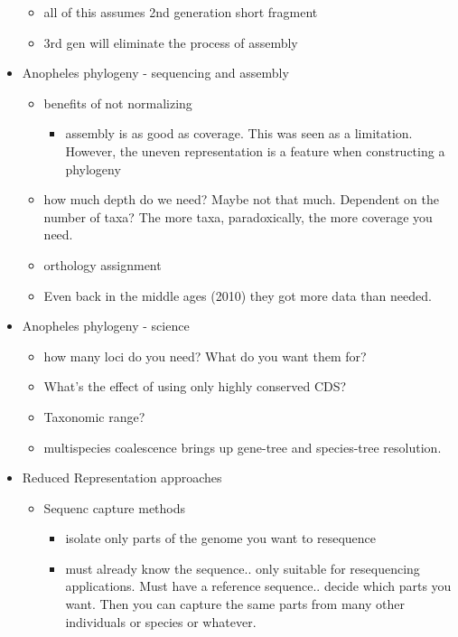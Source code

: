 \documentclass{article}
\begin{document}
\begin{itemize}
\begin{itemize}
            \item all of this assumes 2nd generation short fragment
            \item 3rd gen will eliminate the process of assembly
        \end{itemize}
        \item Anopheles phylogeny - sequencing and assembly
        \begin{itemize}
            \item benefits of not normalizing
            \begin{itemize}
                \item assembly is as good as coverage.  This was seen as a limitation.  However, the uneven representation is a feature when constructing a phylogeny
            \end{itemize}
            \item how much depth do we need?  Maybe not that much.  Dependent on the number of taxa?  The more taxa, paradoxically, the more coverage you need.
            \item orthology assignment
            \item Even back in the middle ages (2010) they got more data than needed.
        \end{itemize}
        \item Anopheles phylogeny - science
        \begin{itemize}
            \item how many loci do you need?  What do you want them for?
            \item What's the effect of using only highly conserved CDS?
            \item Taxonomic range?
            \item multispecies coalescence brings up gene-tree and species-tree resolution.
        \end{itemize}
        \item Reduced Representation approaches
        \begin{itemize}
            \item Sequenc capture methods
            \begin{itemize}
                \item isolate only parts of the genome you want to resequence
                \item must already know the sequence.. only suitable for resequencing applications.  Must have a reference sequence.. decide which parts you want.  Then you can capture the same parts from many other individuals or species or whatever.

\end{itemize}
\end{itemize}
\end{itemize}
\end{document}
